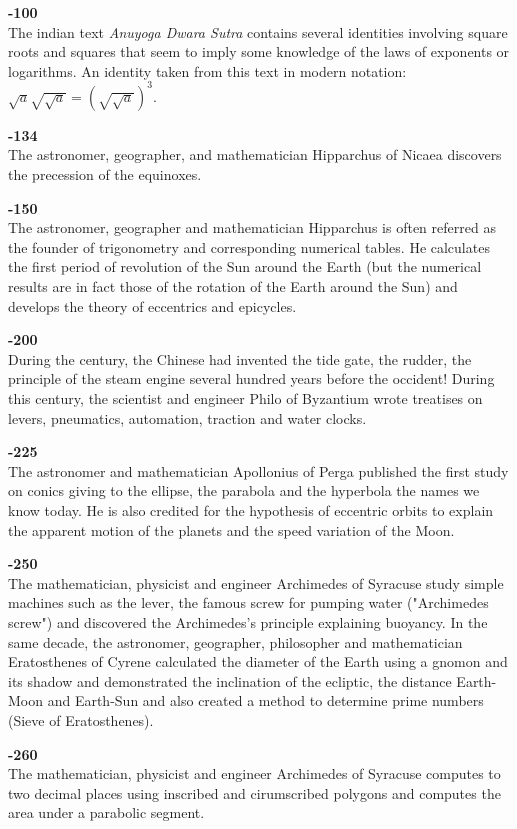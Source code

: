 \textbf{-100}\\
The indian text \textit{Anuyoga Dwara Sutra} contains several identities involving square roots and squares that seem to imply some knowledge of the laws of exponents or logarithms. An identity taken from this text in modern notation: $\sqrt{a}\sqrt{\sqrt{a}}=(\sqrt{\sqrt{a}})^3$.

\textbf{-134}\\
The astronomer, geographer, and mathematician Hipparchus of Nicaea discovers the precession of the equinoxes.

\textbf{-150}\\
The astronomer, geographer and mathematician Hipparchus is often referred as the founder of trigonometry and corresponding numerical tables. He calculates the first period of revolution of the Sun around the Earth (but the numerical results are in fact those of the rotation of the Earth around the Sun) and develops the theory of eccentrics and epicycles.

\textbf{-200}\\
During the century, the Chinese had invented the tide gate, the rudder, the principle of the steam engine several hundred years before the occident! During this century, the scientist and engineer Philo of Byzantium wrote treatises on levers, pneumatics, automation, traction and water clocks.

\textbf{-225}\\
The astronomer and mathematician Apollonius of Perga published the first study on conics giving to the ellipse, the parabola and the hyperbola the names we know today. He is also credited for the hypothesis of eccentric orbits to explain the apparent motion of the planets and the speed variation of the Moon.

\textbf{-250}\\
The mathematician, physicist and engineer Archimedes of Syracuse study simple machines such as the lever, the famous screw for pumping water ("Archimedes screw") and discovered the Archimedes's principle explaining buoyancy. In the same decade, the astronomer, geographer, philosopher and mathematician Eratosthenes of Cyrene calculated the diameter of the Earth using a gnomon and its shadow and demonstrated the inclination of the ecliptic, the distance Earth-Moon and Earth-Sun and also created a method to determine prime numbers (Sieve of Eratosthenes).

\textbf{-260}\\
The mathematician, physicist and engineer Archimedes of Syracuse computes to two decimal places using inscribed and cirumscribed polygons and computes the area under a parabolic segment.

